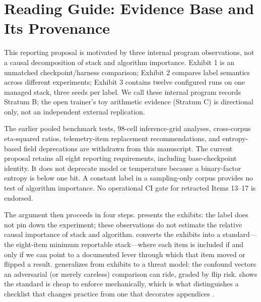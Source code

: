 \section{Reading Guide: Evidence Base and Its Provenance}
\label{sec:p5-results}
This reporting proposal is motivated by three internal program observations,
not a causal decomposition of stack and algorithm importance. Exhibit 1 is
an unmatched checkpoint/harness comparison; Exhibit 2 compares label semantics
across different experiments; Exhibit 3 contains twelve configured runs on
one managed stack, three seeds per label. We call these internal program
records Stratum B; the open trainer's toy arithmetic evidence (Stratum C) is
directional only, not an independent external replication.

The earlier pooled benchmark tests, 98-cell inference-grid analyses,
cross-corpus eta-squared ratios, telemetry-item replacement recommendations,
and entropy-based field deprecations are withdrawn from this manuscript.
The current proposal retains all eight reporting requirements, including
base-checkpoint identity. It does not deprecate model or temperature because
a binary-factor entropy is below one bit. A constant label in a sampling-only
corpus provides no test of algorithm importance. No operational CI gate for
retracted Items 13--17 is endorsed.

The argument then proceeds in four steps.  presents the
exhibits: the label does not pin down the experiment; these observations do
not estimate the relative causal importance of stack and algorithm.
 converts the exhibits
into a standard---the eight-item minimum reportable stack---where each item is
included if and only if we can point to a documented lever through which that
item moved or flipped a result.  generalizes from
exhibits to a threat model: the confound vectors an adversarial (or merely
careless) comparison can ride, graded by flip risk. 
shows the standard is cheap to enforce mechanically, which is what
distinguishes a checklist that changes practice from one that decorates
appendices \citep{pineau2020improving}.
